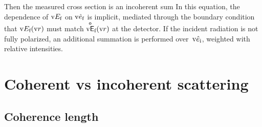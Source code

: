 %
%
Then the measured cross section is an incoherent sum
%
%
%
%
%
In this equation,
the dependence of $\text{v}{E}_{\text{f}}$ on $\text{v}{\hat e}_{\text{f}}$ is implicit,
mediated through the boundary condition
that $\text{v}{E}_{\text{f}}(\text{v}{r})$ must match $\mathsf{\overset{o}{\text{v}{E}}}_{\text{f}}(\text{v}{r})$ at the detector.
If the incident radiation is not fully polarized,
%
an additional summation is performed over~$\text{v}{\hat e}_{\text{i}}$,
weighted with relative intensities.

%

\section{Coherent vs incoherent scattering}\label{Scoherlen}

\subsection{Coherence length}

